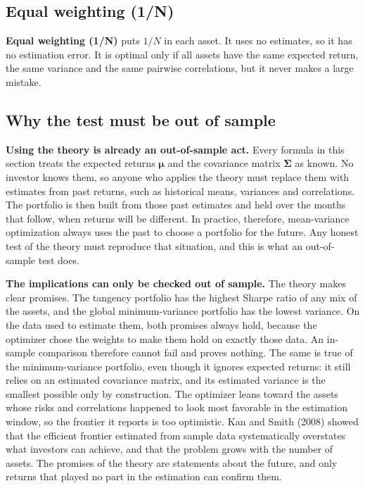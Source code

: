 \subsection{Equal weighting (1/N)}
\label{sec:19-equal}

\textbf{Equal weighting (1/N)} puts $1/N$ in each asset. It uses no estimates, so it has no estimation error. It is optimal only if all assets have the same expected return, the same variance and the same pairwise correlations, but it never makes a large mistake.

\subsection{Why the test must be out of sample}
\label{sec:19-oos}

\textbf{Using the theory is already an out-of-sample act.} Every formula in this section treats the expected returns $\boldsymbol{\mu}$ and the covariance matrix $\boldsymbol{\Sigma}$ as known. No investor knows them, so anyone who applies the theory must replace them with estimates from past returns, such as historical means, variances and correlations. The portfolio is then built from those past estimates and held over the months that follow, when returns will be different. In practice, therefore, mean-variance optimization always uses the past to choose a portfolio for the future. Any honest test of the theory must reproduce that situation, and this is what an out-of-sample test does.

\textbf{The implications can only be checked out of sample.} The theory makes clear promises. The tangency portfolio has the highest Sharpe ratio of any mix of the assets, and the global minimum-variance portfolio has the lowest variance. On the data used to estimate them, both promises always hold, because the optimizer chose the weights to make them hold on exactly those data. An in-sample comparison therefore cannot fail and proves nothing. The same is true of the minimum-variance portfolio, even though it ignores expected returns: it still relies on an estimated covariance matrix, and its estimated variance is the smallest possible only by construction. The optimizer leans toward the assets whose risks and correlations happened to look most favorable in the estimation window, so the frontier it reports is too optimistic. Kan and Smith (2008) showed that the efficient frontier estimated from sample data systematically overstates what investors can achieve, and that the problem grows with the number of assets. The promises of the theory are statements about the future, and only returns that played no part in the estimation can confirm them.

